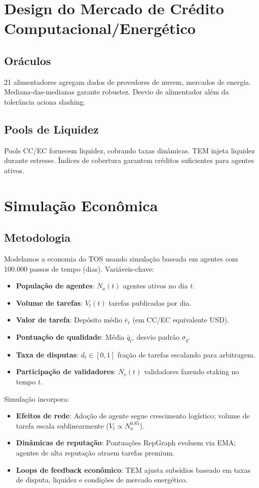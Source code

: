 \documentclass[11pt]{article}
\begin{document}
\begin{itemize}[noitemsep]
\begin{itemize}[noitemsep]
\begin{itemize}[noitemsep]
\section{Design do Mercado de Crédito Computacional/Energético}
\subsection{Oráculos}
21 alimentadores agregam dados de provedores de nuvem, mercados de energia. Mediana-das-medianas garante robustez. Desvio de alimentador além da tolerância aciona slashing.

\subsection{Pools de Liquidez}
Pools CC/EC fornecem liquidez, cobrando taxas dinâmicas. TEM injeta liquidez durante estresse. Índices de cobertura garantem créditos suficientes para agentes ativos.

\section{Simulação Econômica}
\label{sec:econ-sim}

\subsection{Metodologia}
Modelamos a economia do TOS usando simulação baseada em agentes com 100.000 passos de tempo (dias). Variáveis-chave:
\begin{itemize}[noitemsep]
  \item \textbf{População de agentes}: $N_a(t)$ agentes ativos no dia $t$.
  \item \textbf{Volume de tarefas}: $V_t(t)$ tarefas publicadas por dia.
  \item \textbf{Valor de tarefa}: Depósito médio $\bar{e}_t$ (em CC/EC equivalente USD).
  \item \textbf{Pontuação de qualidade}: Média $\bar{q}_t$, desvio padrão $\sigma_q$.
  \item \textbf{Taxa de disputas}: $d_t \in [0,1]$ fração de tarefas escalando para arbitragem.
  \item \textbf{Participação de validadores}: $N_v(t)$ validadores fazendo staking no tempo $t$.
\end{itemize}
Simulação incorpora:
\begin{itemize}[noitemsep]
  \item \textbf{Efeitos de rede}: Adoção de agente segue crescimento logístico; volume de tarefa escala sublinearmente ($V_t \propto N_a^{0.85}$).
  \item \textbf{Dinâmicas de reputação}: Pontuações RepGraph evoluem via EMA; agentes de alta reputação atraem tarefas premium.
  \item \textbf{Loops de feedback econômico}: TEM ajusta subsídios baseado em taxas de disputa, liquidez e condições de mercado energético.
\end{itemize}


\end{itemize}
\end{itemize}
\end{itemize}
\end{document}
